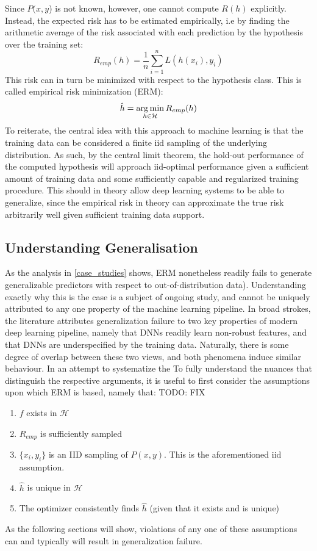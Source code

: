 		Since \(P(x,y\)) is not known, however, one cannot compute \(R(h)\) explicitly. Instead, the expected risk has to be estimated empirically, i.e by finding the arithmetic average of the risk associated with each prediction by the hypothesis over the training set:
		\begin{equation}
		R_{emp}(h) = \frac{1}{n}\sum_{i=1}^{n}L(h(x_i), y_i)
		\end{equation}
		This risk can in turn be minimized with respect to the hypothesis class. This is called empirical risk minimization (ERM):
		\begin{equation}
		\hat{h} = \operatorname*{arg\,min}_{h \in \mathcal{H}}R_{emp}(h)
		\end{equation}
		To reiterate, the central idea with this approach to machine learning is that the training data can be considered a finite iid sampling of the underlying distribution. As such, by the central limit theorem, the hold-out performance of the computed hypothesis will approach iid-optimal performance given a sufficient amount of training data and some sufficiently capable and regularized training procedure. This should in theory allow deep learning systems to be able to generalize, since the empirical risk in theory can approximate the true risk arbitrarily well given sufficient training data support.
	\subsection{Understanding Generalisation}
		As the analysis in \ref{case_studies} shows, ERM nonetheless readily fails to generate generalizable predictors with respect to out-of-distribution data). Understanding exactly why this is the case is a subject of ongoing study, and cannot be uniquely attributed to any one property of the machine learning pipeline. In broad strokes, the literature attributes generalization failure to two key properties of modern deep learning pipeline, namely that DNNs readily learn non-robust features, and that DNNs are underspecified by the training data. 
		Naturally, there is some degree of overlap between these two views, and both phenomena induce similar behaviour. In an attempt to systematize the To fully understand the nuances that distinguish the respective arguments, it is useful to first consider the assumptions upon which ERM is based, namely that: TODO: FIX
		\begin{enumerate}
			\item \(f\) exists in \(\mathcal{H}\) \label{underfit}
			\item \(R_{emp}\) is sufficiently sampled \label{overfit} %
			\item \(\{x_i, y_i\}\) is an IID sampling of \(P(x,y)\). This is the aforementioned iid assumption. \label{structural_misalignment}
			\item \(\hat{h}\) is unique in \(\mathcal{H}\)\label{underspecification}
			\item The optimizer consistently finds \(\hat{h}\) (given that it exists and is unique)\label{opt}
		\end{enumerate}
		As the following sections will show, violations of any one of these assumptions can and typically will result in generalization failure.  


